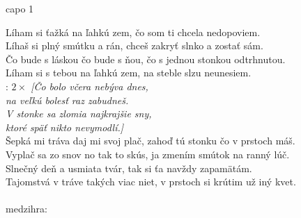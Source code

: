 
\hfill capo 1

Líham si ťažká na ľahkú zem, 
čo som ti chcela nedopoviem.\\
Líhaš si plný smútku a rán, 
chceš zakryť slnko a zostať sám.\\

Čo bude s láskou čo bude s ňou,
čo s jednou stonkou odtrhnutou.\\
Líham si s tebou na ľahkú zem,
na steble slzu neunesiem.\\

\textregistered: \emph{$2\times$ [Čo bolo včera nebýva dnes,\\
na veľkú bolesť raz zabudneš.\\
V stonke sa zlomia najkrajšie sny,\\
ktoré späť nikto nevymodlí.]}\\

Šepká mi tráva daj mi svoj plač,
zahoď tú stonku čo v prstoch máš.\\
Vyplač sa zo snov no tak to skús,
ja zmením smútok na ranný lúč.\\

Slnečný deň a usmiata tvár,
tak si ťa navždy zapamätám.\\
Tajomstvá v tráve takých viac niet,
v prstoch si krútim už iný kvet.\\

\textregistered\\

medzihra:\\

\textregistered

\newpage
